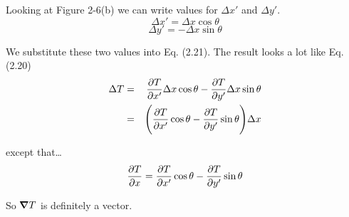 Looking at Figure 2-6(b) we can write values for $\Delta x'$ and $\Delta y'$.
\begin{equation}
  \Delta x' = \Delta x \cos \theta
\end{equation}
\begin{equation}
  \Delta y' =  -\Delta x \sin \theta
\end{equation}

We substitute these two values into Eq. (2.21).
The result looks a lot like Eq. (2.20)
\begin{eqnarray}
  \Delta T &=& \frac{\partial T}{\partial x'} \Delta x \cos \theta - \frac{\partial T}{\partial y'} \Delta x \sin \theta \\
  &=& \Bigg( \frac{\partial T}{\partial x'} \cos \theta - \frac{\partial T}{\partial y'} \sin \theta \Bigg) \Delta x
\end{eqnarray}

except that\ldots
\begin{equation}
  \frac{\partial T}{\partial x} = \frac{\partial T}{\partial x'} \cos \theta - \frac{\partial T}{\partial y'} \sin \theta
\end{equation}

So $\boldsymbol{\nabla} T$ is definitely a vector.

